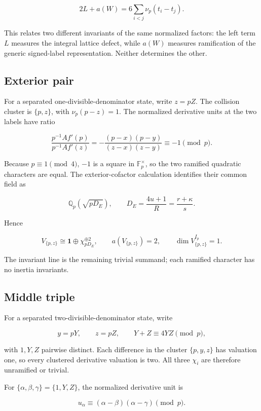 \[
\boxed{
2L+a(W)=6\sum_{i<j}\nu_p(t_i-t_j).
}
\tag{LG3}
\]

This relates two different invariants of the same normalized factors:
the left term \(L\) measures the integral lattice defect, while \(a(W)\)
measures ramification of the generic signed-label representation.
Neither determines the other.

\subsection{Exterior pair}\label{exterior-pair}

For a separated one-divisible-denominator state, write \(z=pZ\). The
collision cluster is \(\{p,z\}\), with \(\nu_p(p-z)=1\). The normalized
derivative units at the two labels have ratio

\[
\frac{p^{-1}Af'(p)}{p^{-1}Af'(z)}
=
-\frac{(p-x)(p-y)}{(z-x)(z-y)}
\equiv-1\pmod p.
\]

Because \(p\equiv1\pmod4\), \(-1\) is a square in
\(\mathbb F_p^\times\), so the two ramified quadratic characters are
equal. The exterior-cofactor calculation identifies their common field
as

\[
\mathbb Q_p(\sqrt{pD_E}),\qquad
D_E=\frac{4u+1}{R}=\frac{r+\kappa}{s}.
\]

Hence

\[
\boxed{
V_{\{p,z\}}
\cong\mathbf1\oplus\chi_{pD_E}^{\oplus2},
\qquad
a(V_{\{p,z\}})=2,
\qquad
\dim V_{\{p,z\}}^{I_p}=1.
}
\tag{LG4}
\]

The invariant line is the remaining trivial summand; each ramified
character has no inertia invariants.

\subsection{Middle triple}\label{middle-triple}

For a separated two-divisible-denominator state, write

\[
y=pY,\qquad z=pZ,\qquad Y+Z\equiv4YZ\pmod p,
\]

with \(1,Y,Z\) pairwise distinct. Each difference in the cluster
\(\{p,y,z\}\) has valuation one, so every clustered derivative valuation
is two. All three \(\chi_i\) are therefore unramified or trivial.

For \(\{\alpha,\beta,\gamma\}=\{1,Y,Z\}\), the normalized derivative
unit is

\[
u_\alpha\equiv(\alpha-\beta)(\alpha-\gamma)\pmod p.
\tag{LG5}
\]

